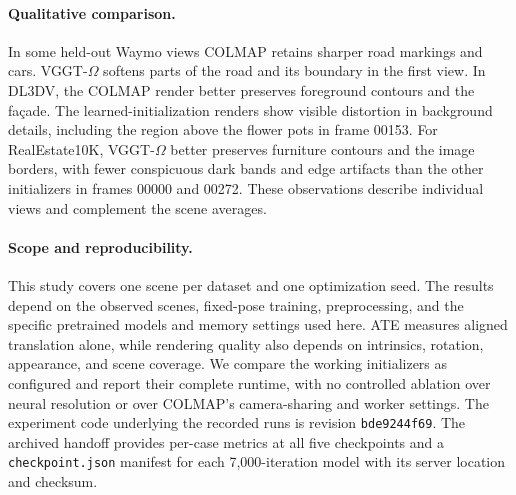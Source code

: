 \paragraph{Qualitative comparison.}
%
In some held-out Waymo views COLMAP retains sharper road markings and cars. VGGT-$\Omega$ softens parts of the road and its boundary in the first view. In DL3DV, the COLMAP render better preserves foreground contours and the fa\c{c}ade. The learned-initialization renders show visible distortion in background details, including the region above the flower pots in frame 00153. For RealEstate10K, VGGT-$\Omega$ better preserves furniture contours and the image borders, with fewer conspicuous dark bands and edge artifacts than the other initializers in frames 00000 and 00272. These observations describe individual views and complement the scene averages.

\paragraph{Scope and reproducibility.}
This study covers one scene per dataset and one optimization seed. The results depend on the observed scenes, fixed-pose training, preprocessing, and the specific pretrained models and memory settings used here. ATE measures aligned translation alone, while rendering quality also depends on intrinsics, rotation, appearance, and scene coverage. We compare the working initializers as configured and report their complete runtime, with no controlled ablation over neural resolution or over COLMAP's camera-sharing and worker settings. The experiment code underlying the recorded runs is revision \texttt{bde9244f69}. The archived handoff provides per-case metrics at all five checkpoints and a \texttt{checkpoint.json} manifest for each 7,000-iteration model with its server location and checksum.

